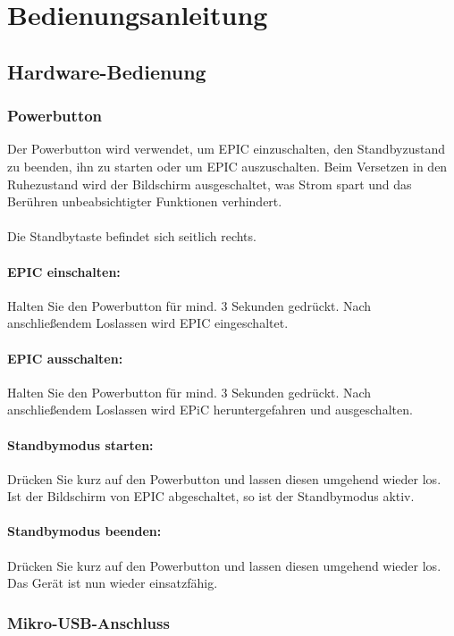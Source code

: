 \section{Bedienungsanleitung}

\subsection{Hardware-Bedienung}

\subsubsection{Powerbutton}

Der Powerbutton wird verwendet, um EPIC einzuschalten, den Standbyzustand zu beenden, ihn zu starten oder um EPIC auszuschalten. Beim Versetzen in den Ruhezustand wird der Bildschirm ausgeschaltet, was Strom spart und das Berühren unbeabsichtigter Funktionen verhindert.\\
\\
Die Standbytaste befindet sich seitlich rechts.


\paragraph{EPIC einschalten:}
Halten Sie den Powerbutton für mind. 3 Sekunden gedrückt. Nach anschließendem Loslassen wird EPIC eingeschaltet.

\paragraph{EPIC ausschalten:}
Halten Sie den Powerbutton für mind. 3 Sekunden gedrückt. Nach anschließendem Loslassen wird EPiC heruntergefahren und ausgeschalten.

\paragraph{Standbymodus starten:}
Drücken Sie kurz auf den Powerbutton und lassen diesen umgehend wieder los. Ist der Bildschirm von EPIC abgeschaltet, so ist der Standbymodus aktiv.

\paragraph{Standbymodus beenden:}
Drücken Sie kurz auf den Powerbutton und lassen diesen umgehend wieder los. Das Gerät ist nun wieder einsatzfähig.

\subsubsection{Mikro-USB-Anschluss}

